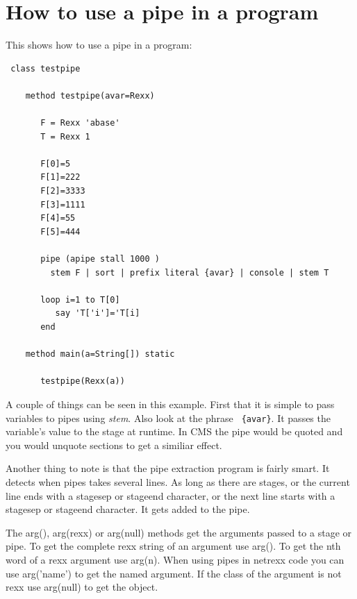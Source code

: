 \chapter{How to use a pipe in a \nr{} program}

This shows how to use a pipe in a \nr{} program:

\begin{lstlisting}
 class testpipe

    method testpipe(avar=Rexx)

       F = Rexx 'abase'
       T = Rexx 1

       F[0]=5
       F[1]=222
       F[2]=3333
       F[3]=1111
       F[4]=55
       F[5]=444

       pipe (apipe stall 1000 )
         stem F | sort | prefix literal {avar} | console | stem T

       loop i=1 to T[0]
          say 'T['i']='T[i]
       end

    method main(a=String[]) static

       testpipe(Rexx(a))
\end{lstlisting}
 A couple of things can be seen in this example.  First that it is
 simple to pass \nr{} variables to pipes using \emph{stem}.  Also look
 at the phrase \texttt{ \{avar\}}. It passes the \nr{} variable's value to the stage at runtime.  In CMS the pipe would be quoted and you would unquote sections to get a similiar effect.

 Another thing to note is that the pipe extraction program is fairly smart. It detects when pipes takes several lines.  As long as there are stages, or the current line ends with a stagesep or stageend character, or the next line starts with a stagesep or stageend character.  It gets added to the pipe.

 The arg(), arg(rexx) or arg(null) methods get the arguments passed to
 a stage or pipe.  To get the complete rexx string of an argument use
 arg(). To get the nth word of a rexx argument use arg(n).  When using
 pipes in netrexx code you can use arg('name') to get the named
 argument. If the class of the argument is not rexx use arg(null) to
 get the object.
 
